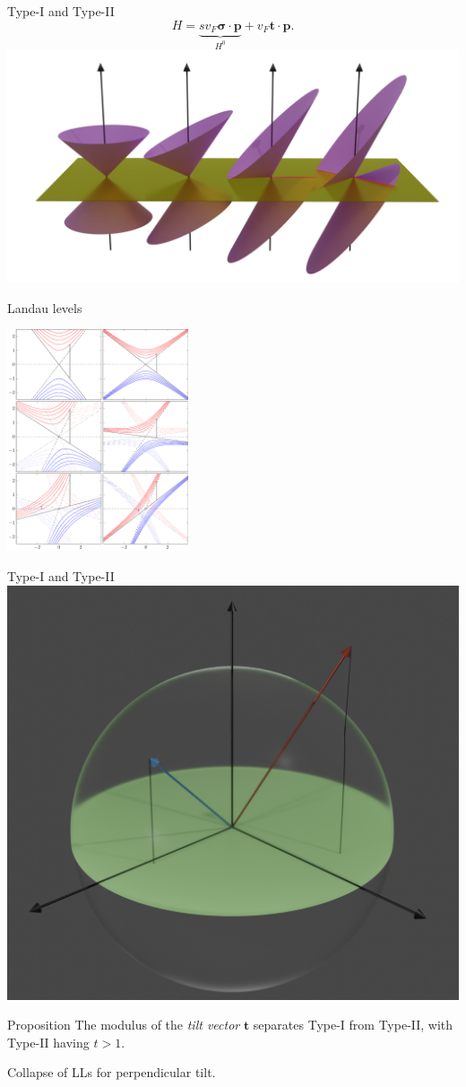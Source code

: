 \documentclass{beamer}
\renewcommand\vec\bm
\begin{document}
\begin{frame}{Type-I and Type-II}
  \centering
  \[
H = \underbrace{s v_F \vec{\sigma} \cdot \vec{p}}_{H^0} + v_F \vec{t} \cdot \vec{p}.
\]
  \includegraphics[width=.7\textwidth]{cones-tilt-color1}
\end{frame}
\begin{frame}{Landau levels}
  \begin{center}
    \includegraphics[width=0.4\textwidth]{lllevels}
  \end{center}
\end{frame}
\begin{frame}{Type-I and Type-II}
  \centering
  \includegraphics[width=.5\textwidth]{tiltSpherewBackground}
  \begin{block}{Proposition}
    The modulus of the \emph{tilt vector} \( \vec{t} \) separates Type-I from Type-II, with Type-II having \( t > 1 \).

    Collapse of LLs for perpendicular tilt.
  \end{block}
\end{frame}
\end{document}
